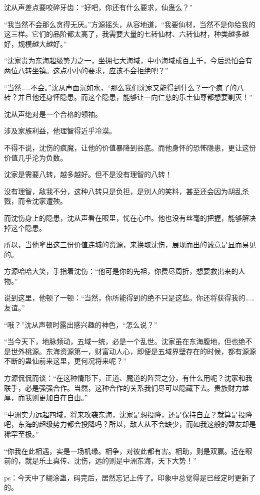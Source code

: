 \begin{this_body}
沈从声差点要咬碎牙齿：“好吧，你还有什么要求，仙蛊么？”

“我当然不会那么贪得无厌。”方源摇头，从容地道，“我要仙材，当然不是你给我的这三样。它们的品阶都太高了，我需要大量的七转仙材、六转仙材，种类越多越好，规模越大越好。”

“沈家贵为东海超级势力之一，坐拥七大海域，中小海域成百上千，今后恐怕会有两位八转坐镇。这点小小的要求，应该不会拒绝吧？”

“当然……不会。”沈从声面沉如水，“那么我们沈家又能得到什么？一个疯了的八转？并且他还身怀隐患。而这个隐患，能够让一向仁慈的乐土仙尊都想要剿灭！”

沈从声绝对是一个合格的领袖。

涉及家族利益，他理智得近乎冷漠。

不得不说，沈伤的疯魔，让他的价值暴降到谷底。而他身怀的恐怖隐患，更让这份价值几乎沦为负数。

沈家是需要八转，越多越好。但不是没有理智的八转！

没有理智，敌我不分，这种八转只是负担，是别人的笑料，甚至还会因为胡乱杀戮，而令沈家遭殃。

而沈伤身上的隐患，沈从声看在眼里，忧在心中。他也没有丝毫的把握，能够解决掉这个隐患。

所以，当他拿出这三份价值连城的资源，来换取沈伤，展现而出的诚意是显而易见的。

方源哈哈大笑，手指着沈伤：“他可是你的先祖，你费尽周折，想要救出来的人物。”

说到这里，他顿了一顿：“当然，你所能得到的绝不只是这些。你还将获得我的……友谊。”

“哦？”沈从声顿时露出感兴趣的神色，“怎么说？”

“当今天下，地脉频动，五域一统，必是一个乱世。沈家虽在东海腹地，但也绝不是世外桃源。东海资源第一，财富动人心，即便是五域界壁存在的时候，都有源源不断的蛊仙前来这里，更何况将来呢？”

方源侃侃而谈：“在这种情形下，正道、魔道的阵营之分，有什么用呢？沈家和我联手，必是强强合作。当然，这种合作的关系我们尽可以隐藏下去。贵族财力雄厚，而我则更加自在自由。”

“中洲实力远超四域，将来攻袭东海，沈家是想投降，还是保持自立？就算是投降吧，东海的超级势力都会投降吗？所以，敌人从不会缺少，而如我这般的盟友却是稀罕至极。”

“你我在此相遇，实是一场机缘。相争，对彼此都有害。相助，则是双赢。近在眼前的，就是乐土真传、沈伤，远的则是中洲东海，天下大势！”

ps：今天中了糊涂蛊，码完后，居然忘记上传了。印象中总觉得是已经定时更新了的。

\end{this_body}

